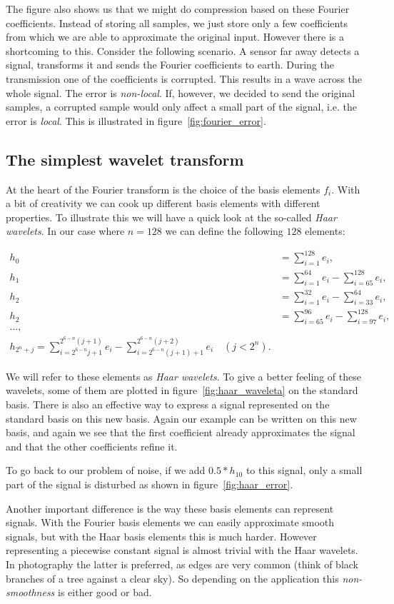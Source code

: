The figure also shows us that we might do compression based on these Fourier coefficients. Instead of storing all samples, we just store only a few coefficients from which we are able to approximate the original input. However there is a shortcoming to this. Consider the following scenario. A sensor far away detects a signal, transforms it and sends the Fourier coefficients to earth. During the transmission one of the coefficients is corrupted. This results in a wave across the whole signal. The error is \emph{non-local}. If, however, we decided to send the original samples, a corrupted sample would only affect a small part of the signal, i.e. the error is \emph{local}. This is illustrated in figure~\ref{fig:fourier_error}.



\subsection{The simplest wavelet transform}
At the heart of the Fourier transform is the choice of the basis elements $f_i$. With a bit of creativity we can cook up different basis elements with different properties. To illustrate this we will have a quick look at the so-called \emph{Haar wavelets}. In our case where $n=128$ we can define the following $128$ elements:

\begin{align}
	h_0 &= \sum_{i=1}^{128} e_i, \\
	h_1 &= \sum_{i=1}^{64} e_i - \sum_{i=65}^{128} e_i, \\
	h_2 &= \sum_{i=1}^{32} e_i - \sum_{i=33}^{64} e_i, \\
	h_2 &= \sum_{i=65}^{96} e_i - \sum_{i=97}^{128} e_i, \\
	\ldots, & \\
	h_{2^n + j} = \sum_{i=2^{6-n}j+1}^{2^{6-n}(j+1)} e_i - \sum_{i=2^{6-n}(j+1)+1}^{2^{6-n}(j+2)} e_i \quad (j < 2^n).
\end{align}

We will refer to these elements as \emph{Haar wavelets}. To give a better feeling of these wavelets, some of them are plotted in figure~\ref{fig:haar_waveleta} on the standard basis. There is also an effective way to express a signal represented on the standard basis on this new basis. Again our example can be written on this new basis, and again we see that the first coefficient already approximates the signal and that the other coefficients refine it.

To go back to our problem of noise, if we add $0.5*h_10$ to this signal, only a small part of the signal is disturbed as shown in figure~\ref{fig:haar_error}.

Another important difference is the way these basis elements can represent signals. With the Fourier basis elements we can easily approximate smooth signals, but with the Haar basis elements this is much harder. However representing a piecewise constant signal is almost trivial with the Haar wavelets. In photography the latter is preferred, as edges are very common (think of black branches of a tree against a clear sky). So depending on the application this \emph{non-smoothness} is either good or bad.
